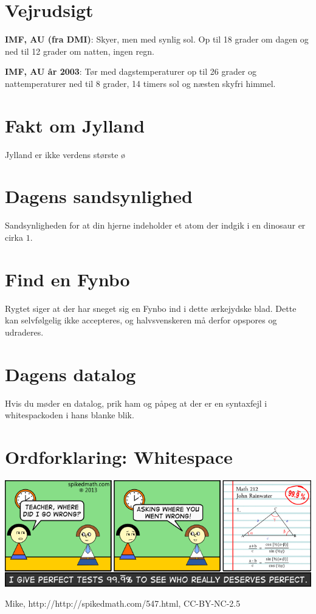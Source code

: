 \begin{minipage}[b]{0.95\linewidth}
\begin{minipage}[t]{0.47\textwidth}
\section*{Vejrudsigt}
\textbf{IMF, AU (fra DMI)}: Skyer, men med synlig sol. Op til 18 grader om dagen og ned til 12 grader om natten, ingen regn.

\textbf{IMF, AU år 2003}: Tør med dagstemperaturer op til 26 grader og nattemperaturer ned til 8 grader, 14 timers sol og næsten skyfri himmel.

\section*{Fakt om Jylland}
Jylland er ikke verdens største ø

\section*{Dagens sandsynlighed}
Sandsynligheden for at din hjerne indeholder et atom der indgik i en dinosaur er cirka $1$.

\section*{Find en Fynbo}
Rygtet siger at der har sneget sig en Fynbo ind i dette ærkejydske blad. Dette kan selvfølgelig ikke accepteres, og halvsvenskeren må derfor opspores og udraderes.

\section*{Dagens datalog}
Hvis du møder en datalog, prik ham og påpeg at der er en syntaxfejl i whitespackoden i hans blanke blik.

\section*{Ordforklaring: Whitespace}
\vspace{4cm}
\end{minipage}

\includegraphics[width=\textwidth]{547-the-perfect-score.png}
\begin{center}
\tiny Mike, http://http://spikedmath.com/547.html, CC-BY-NC-2.5


\end{center}
\end{minipage}
